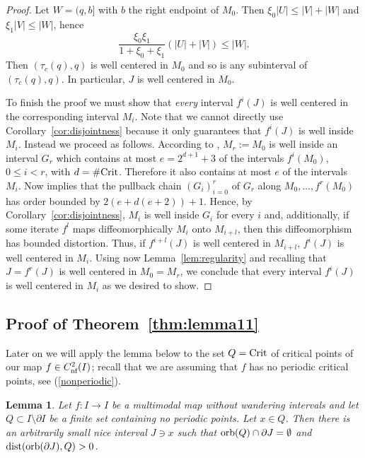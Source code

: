 \documentclass[12pt, psamsfonts, reqno]{amsart}
\newtheorem{lemma}[theorem]{Lemma}
\begin{document}
\begin{proof}
 Let $W=(q,b]$ with $b$ the right
 endpoint of $M_0$. Then $\xi_0|U|\leq |V|+|W|$ and $\xi_1|V|\leq
 |W|$, hence
 $$
  \frac{\xi_0\xi_1}{1+\xi_0+\xi_1} (|U|+|V|)\leq |W|.
 $$
 Then $(\tau_c(q),q)$ is
 well centered in $M_0$ and so is any subinterval of
 $(\tau_c(q),q)$. In particular, $J$ is well
 centered in $M_0$.

 To finish the proof we must show that \emph{every}
 interval $f^i(J)$ is well centered
 in the corresponding interval $M_i$. Note that we cannot
 directly use Corollary~\ref{cor:disjointness}
 because it only guarantees that
 $f^i(J)$ is well inside $M_i$. Instead we proceed as
 follows. According to \cite[Lemma~2]{vSV}, $M_r:=M_0$ is well
 inside an interval $G_r$ which contains at most $e=2^{d+1}+3$ of the
 intervals $f^i(M_0)$, $0\leq i<r$, with $d = \# {\mathop{\rm Crit}\nolimits}$. Therefore it also contains at most $e$ of the intervals
 $M_i$. Now \cite[Lemma~3]{vSV} implies that the pullback chain $(G_i)_{i=0}^r$ of
 $G_r$ along $M_0,\ldots,f^r(M_0)$ has order bounded by
 $2(e+d(e+2))+1$. Hence, by Corollary~\ref{cor:disjointness}, $M_i$ is well inside
 $G_i$ for every $i$
 and, additionally, if some iterate $f^l$ maps
 diffeomorphically $M_i$ onto $M_{i+l}$, then this
 diffeomorphism has bounded distortion. Thus, if $f^{i+l}(J)$ is
 well centered in $M_{i+l}$, $f^i(J)$ is well centered in $M_i$.
 Using now Lemma~\ref{lem:regularity} and recalling
 that $J=f^r(J)$ is well centered in $M_0=M_r$,
 we conclude that every interval $f^i(J)$ is well centered in
 $M_i$ as we desired to show.
\end{proof}

\subsection{Proof of Theorem~\ref{thm:lemma11}}

Later on we will apply the lemma below to the set $Q={\mathop{\rm Crit}\nolimits}$ of
critical points of our map $f\in {C^2_{\text{\rm nf}}}(I)$; recall that we are
assuming that $f$ has no periodic critical points, see
(\ref{nonperiodic}).

\begin{lemma} \label{lem:small}
 Let $f:I\to I$ be a multimodal map without wandering intervals
 and let $Q\subset I\setminus \partial I$ be a finite set
 containing no periodic points. Let $x \in Q$.
 Then there is an arbitrarily small nice interval $J \ni x$
 such that ${\mathop{\rm orb}\nolimits}(Q)\cap \partial J=\emptyset$ and ${\mathop{\rm dist}\nolimits}({\mathop{\rm orb}\nolimits}(\partial
 J),Q)>0$.
\end{lemma}
\end{document}
